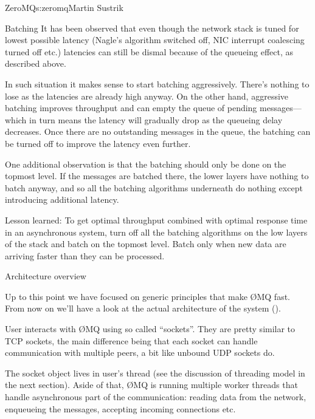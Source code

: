\begin{aosachapter}{ZeroMQ}{s:zeromq}{Martin Sustrik}
\begin{aosasect1}{Batching}
It has been observed that even though the network stack is tuned for
lowest possible latency (Nagle's algorithm switched off, NIC interrupt
coalescing turned off etc.) latencies can still be dismal because of
the queueing effect, as described above.

In such situation it makes sense to start batching
aggressively. There's nothing to lose as the latencies are already
high anyway. On the other hand, aggressive batching improves
throughput and can empty the queue of pending messages---which in
turn means the latency will gradually drop as the queueing delay
decreases. Once there are no outstanding messages in the queue, the
batching can be turned off to improve the latency even further.

One additional observation is that the batching should only be done on
the topmost level. If the messages are batched there, the lower layers
have nothing to batch anyway, and so all the batching algorithms
underneath do nothing except introducing additional latency.

Lesson learned: To get optimal throughput combined with optimal
response time in an asynchronous system, turn off all the batching
algorithms on the low layers of the stack and batch on the topmost
level. Batch only when new data are arriving faster than they can be
processed.

\end{aosasect1}

\begin{aosasect1}{Architecture overview}

Up to this point we have focused on generic principles that make ØMQ
fast. From now on we'll have a look at the actual architecture of the
system ().


User interacts with ØMQ using so called ``sockets''. They are pretty
similar to TCP sockets, the main difference being that each socket can
handle communication with multiple peers, a bit like unbound UDP
sockets do.

The socket object lives in user's thread (see the discussion of
threading model in the next section). Aside of that, ØMQ is running
multiple worker threads that handle asynchronous part of the
communication: reading data from the network, enqueueing the messages,
accepting incoming connections etc.


\end{aosasect1}
\end{aosachapter}
